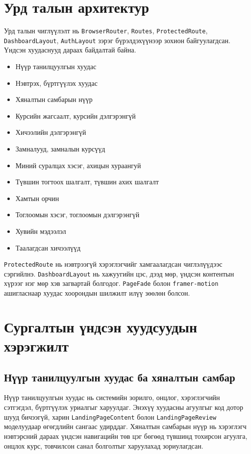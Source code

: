 \section{Урд талын архитектур}
Урд талын чиглүүлэлт нь \texttt{BrowserRouter}, \texttt{Routes}, \texttt{ProtectedRoute}, \texttt{DashboardLayout}, \texttt{AuthLayout} зэрэг бүрэлдэхүүнээр зохион байгуулагдсан. Үндсэн хуудаснууд дараах байдалтай байна.
\begin{itemize}
\item Нүүр танилцуулгын хуудас
\item Нэвтрэх, бүртгүүлэх хуудас
\item Хяналтын самбарын нүүр
\item Курсийн жагсаалт, курсийн дэлгэрэнгүй
\item Хичээлийн дэлгэрэнгүй
\item Замналууд, замналын курсүүд
\item Миний суралцах хэсэг, ахицын хураангуй
\item Түвшин тогтоох шалгалт, түвшин ахих шалгалт
\item Хамтын орчин
\item Тоглоомын хэсэг, тоглоомын дэлгэрэнгүй
\item Хувийн мэдээлэл
\item Таалагдсан хичээлүүд
\end{itemize}

\texttt{ProtectedRoute} нь нэвтрээгүй хэрэглэгчийг хамгаалагдсан чиглэлүүдээс сэргийлнэ. \texttt{DashboardLayout} нь хажуугийн цэс, дээд мөр, үндсэн контентын хүрээг нэг мөр хэв загвартай болгодог. \texttt{PageFade} болон \texttt{framer-motion} ашигласнаар хуудас хоорондын шилжилт илүү зөөлөн болсон.

\section{Сургалтын үндсэн хуудсуудын хэрэгжилт}
\subsection{Нүүр танилцуулгын хуудас ба хяналтын самбар}
Нүүр танилцуулгын хуудас нь системийн зорилго, онцлог, хэрэглэгчийн сэтгэгдэл, бүртгүүлэх уриалгыг харуулдаг. Энэхүү хуудасны агуулгыг код дотор шууд бичээгүй, харин \texttt{LandingPageContent} болон \texttt{LandingPageReview} моделуудаар өгөгдлийн сангаас удирддаг. Хяналтын самбарын нүүр нь хэрэглэгч нэвтэрсний дараах үндсэн навигацийн төв цэг бөгөөд түвшинд тохирсон агуулга, онцлох курс, товчилсон санал болголтыг харуулахад зориулагдсан.

